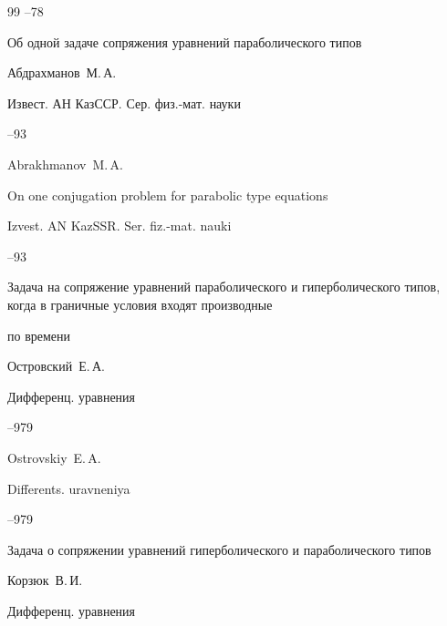 \begin{thebibliography}{99}
--78





\paper Об одной задаче сопряжения уравнений параболического типов

\by Абдрахманов~М.\,А.

\jour Извест. АН КазССР. Сер. физ.-мат. науки



--93

\misctransl 

\by Abrakhmanov~M.\,A.

\paper On one  conjugation problem for parabolic type equations 

\jour Izvest. AN KazSSR. Ser. fiz.-mat. nauki



--93





\paper Задача на сопряжение уравнений параболического и гиперболического типов, когда в граничные условия входят производные 

по времени

\by Островский~Е.\,А.

\jour Дифференц. уравнения




--979

\misctransl

\by Ostrovskiy~E.\,A.

\jour Differents. uravneniya




--979





\paper Задача о сопряжении уравнений гиперболического и параболического типов

\by Корзюк~В.\,И.

\jour Дифференц. уравнения



\end{thebibliography}
